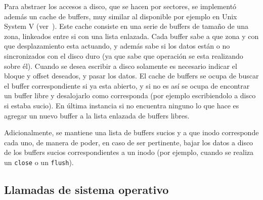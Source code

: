 Para abstraer los accesos a disco, que se hacen por sectores, se implement\'o adem\'as un cache de buffers, muy similar al disponible por
ejemplo en Unix System V (ver~\cite{systemv}). Este cache consiste en una serie de buffers de tama\~no de una zona, linkeados entre si con
una lista enlazada. Cada buffer sabe a que zona y con que desplazamiento esta actuando, y adem\'as sabe si los datos est\'an o no sincronizados
con el disco duro (ya que sabe que operaci\'on se esta realizando sobre \'el). Cuando se desea escribir a disco solamente es necesario indicar
el bloque y offset deseados, y pasar los datos. El cache de buffers se ocupa de buscar el buffer correspondiente si ya esta abierto, y si no
es as\'i se ocupa de encontrar un buffer libre y desalojarlo como corresponda (por ejemplo escribiendolo a disco si estaba sucio). En \'ultima
instancia si no encuentra ninguno lo que hace es agregar un nuevo buffer a la lista enlazada de buffers libres.

Adicionalmente, se mantiene una lista de buffers sucios y a que inodo corresponde cada uno, de manera de poder, en caso de ser pertinente, bajar
los datos a disco de los buffers sucios correspondientes a un inodo (por ejemplo, cuando se realiza un \texttt{close} o un \texttt{flush}).

\subsection{Llamadas de sistema operativo}
\label{sec::filesystem_syscalls}
